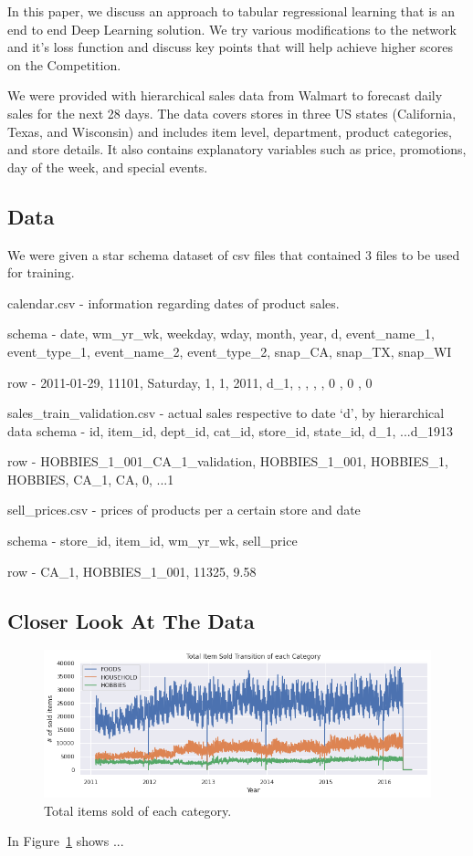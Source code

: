 \documentclass[10pt,twocolumn,letterpaper]{article}
\begin{document}
In this paper, we discuss an approach to tabular regressional learning that is
an end to end Deep Learning solution. We try various modifications to the
network and it's loss function and discuss key points that will help achieve
higher scores on the Competition.

We were provided with hierarchical sales data from Walmart to forecast daily
sales for the next 28 days. The data covers stores in three US states
(California, Texas, and Wisconsin) and includes item level, department, product
categories, and store details. It also contains explanatory variables such as
price, promotions, day of the week, and special events.



\subsection{Data}
  We were given a star schema dataset of csv files that contained 3 files to be
  used for training.

  calendar.csv - information regarding dates of product sales.

  schema - date, wm\_yr\_wk, weekday, wday, month, year, d, event\_name\_1,
  event\_type\_1, event\_name\_2, event\_type\_2, snap\_CA, snap\_TX, snap\_WI

  row - 2011-01-29, 11101, Saturday, 1, 1, 2011, d\_1, , , , , 0 , 0 , 0


  sales\_train\_validation.csv - actual sales respective to date ‘d’, by hierarchical data
  schema - id, item\_id, dept\_id, cat\_id, store\_id, state\_id, d\_1, ...d\_1913

  row - HOBBIES\_1\_001\_CA\_1\_validation, HOBBIES\_1\_001, HOBBIES\_1, HOBBIES, CA\_1, CA, 0, ...1

  sell\_prices.csv - prices of products per a certain store and date

  schema -  store\_id, item\_id, wm\_yr\_wk, sell\_price

  row - CA\_1, HOBBIES\_1\_001, 11325, 9.58



\subsection{Closer Look At The Data}


\begin{figure}
  \begin{center}
    \includegraphics[width=0.8\linewidth]{img/totalItemSoldofEachCategory.png}
  \end{center}
  \caption{Total items sold of each category.}
  \label{fig:totalItemSoldofEachCategory}
\end{figure}
In Figure~\ref{fig:totalItemSoldofEachCategory} shows ...
\end{document}
